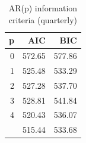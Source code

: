 \begin{table}

\caption{\label{tab:ar-arima-models}AR(p) information criteria (quarterly)}
\centering
\begin{tabular}[t]{rrr}
\toprule
p & AIC & BIC\\
\midrule
0 & 572.65 & 577.86\\
1 & 525.48 & 533.29\\
2 & 527.28 & 537.70\\
3 & 528.81 & 541.84\\
4 & 520.43 & 536.07\\
\addlinespace
5 & 515.44 & 533.68\\
\bottomrule
\end{tabular}
\end{table}
